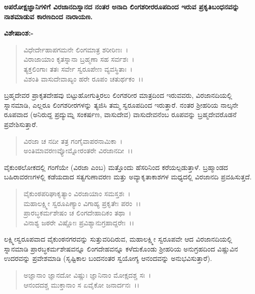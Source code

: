 \begin{center}
\textbf{ಅಪರೋಕ್ಷಜ್ಞಾನಿಗಳಿಗೆ ವಿರಜಾನದಿಸ್ನಾನದ ನಂತರ ಅನಾದಿ ಲಿಂಗಶರೀರರೂಪದಿಂದ ಇರುವ ಪ್ರಕೃತಿಬಂಧನವನ್ನು ನಾಶಮಾಡುವ ಕಾರಣದಿಂದ ನಾರಾಯಣ.}
\end{center}

\noindent
\textbf{ವಿಶೇಷಾಂಶ:-}

\begin{verse}
ವಿಧೇರ್ದೇಹಾಪಗಮನೇ ಲಿಂಗಮಾತ್ರ ಶರೀರಿಣಃ~।\\ ವಿರಾಜಾಯಾಂ ಕೃತಸ್ನಾನಾ ಬ್ರಹ್ಮಣಾ ಸಹ ಸರ್ವಶಃ~।\\ ತ್ಯಕ್ತಲಿಂಗಾಃ ತತಃ ಸರ್ವೇ ಸ್ವರೂಪೇಣ ವ್ಯವಸ್ಥಿತಾಃ~।\\ ವಿಶಂತಿ ವಾಸುದೇವಾಖ್ಯಂ ಹರೇ ರೂಪಂ ಚತುರ್ಥಕಂ~।।
\end{verse}


ಬ್ರಹ್ಮದೇವರ ಪ್ರಾಕೃತದೇಹವು ಬಿಟ್ಟುಹೋಗುತ್ತಿರಲು ಲಿಂಗಶರೀರ ಮಾತ್ರದಿಂದ ಇರುವವರು, ವಿರಜಾನದಿಯಲ್ಲಿ ಸ್ನಾನಮಾಡಿ, ಎಲ್ಲರೂ ಲಿಂಗಶರೀರಗಳನ್ನು ತ್ಯಜಿಸಿ ತಮ್ಮ ಸ್ವರೂಪದಿಂದ ಇರುತ್ತಾರೆ. ನಂತರ ಶ‍್ರೀಹರಿಯ ನಾಲ್ಕನೇ ರೂಪವಾದ (ಅನಿರುದ್ದ ಪ್ರದ್ಯುಮ್ನ ಸಂಕರ್ಷಣ, ವಾಸುದೇವ) ವಾಸುದೇವನೆಂಬ ರೂಪವನ್ನು ಬ್ರಹ್ಮದೇವರೊಡನೆ ಪ್ರವೇಶಿಸುತ್ತಾರೆ.

\begin{verse}
ವಿರಜಾ ಚ ನದೀ ತತ್ರ ಗಂಗೈವಾಪರನಾಮಿಕಾ~।\\ ಅಂತಿಮಾವರಣವ್ಯೋಮ್ನೋರಂತರೇ ವಿರಜಾನದೀ~।।
\end{verse}


ವೈಕುಂಠಲೋಕದಲ್ಲಿ ಗಂಗೆಯೇ (ವಿರಜಾ ಎಂಬ) ಮತ್ತೊಂದು ಹೆಸರಿನಿಂದ ಕರೆಯಲ್ಪಡುತ್ತಾಳೆ. ಬ್ರಹ್ಮಾಂಡದ ಬಹಿರಾವರಣಗಳಲ್ಲಿ ಕಡೆಯದಾದ ಸತ್ವಗುಣಾವರಣ ಮತ್ತು ಅವ್ಯಾಕೃತಾಕಾಶಗಳ ಮಧ್ಯದಲ್ಲಿ ವಿರಜಾನದಿ ಪ್ರವಹಿಸುತ್ತದೆ.

\begin{verse}
ವೈಕುಂಠಪರಿಘಾಕೃತ್ಯಾಂ ವಿರಜಾಯಾಂ ಸಮಸ್ತಶಃ~।\\ ಮಹಾಲಕ್ಷ್ಮೀ ಸ್ವರೂಪಿಣ್ಯಾಂ ವಿಗಾಹ್ಯ ಪ್ರಕೃತೇಃ ಪರಂ~।।\\ ಪ್ರಾರಬ್ಧಕರ್ಮಶೇಷಂ ಚ ಲಿಂಗದೇಹಾದಿಕಂ ತಥಾ~।\\ ವಿನಾಶ್ಯ ಜಠರೇ ವಿಷ್ಣೋಃ ಪ್ರವಿಶ್ಯಾನುಗ್ರಹಾದ್ದರೇಃ~।।
\end{verse}


ಲಕ್ಷ್ಮೀಸ್ವರೂಪವಾದ ವೈಕುಂಠನಗರವನ್ನು ಸುತ್ತುವರಿದಿರುವ, ಮಹಾಲಕ್ಷ್ಮೀ ಸ್ವರೂಪವೇ ಆದ ವಿರಜಾನದಿಯಲ್ಲಿ ಸ್ನಾನಮಾಡಿ ಪ್ರಾರಬ್ಧಕರ್ಮಶೇಷವನ್ನೂ ಲಿಂಗದೇಹವನ್ನೂ ಕಳೆದುಕೊಂಡು ಶ‍್ರೀಹರಿಯ ಅನುಗ್ರಹದಿಂದ ವಿಷ್ಣುವಿನ ಉದರವನ್ನು ಪ್ರವೇಶಮಾಡಿ (ಸೃಷ್ಟಿಕಾಲ ಬಂದನಂತರ ಸ್ವಯೋಗ್ಯ ಆನಂದವನ್ನು ಅನುಭವಿಸುತ್ತಾರೆ).

\begin{verse}
ಅಜ್ಞಾನಾಂ ಜ್ಞಾನದೋ ವಿಷ್ಣುಃ ಜ್ಞಾನಿನಾಂ ಮೋಕ್ಷದಶ್ಚ ಸಃ~।\\ ಆನಂದದಶ್ಚ ಮುಕ್ತಾನಾಂ ಸ ಏವೈಕೋ ಜನಾರ್ದನಃ~।।
\end{verse}

